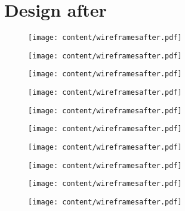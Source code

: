 \section{Design after}
\label{appendix:b}
\begin{figure}[H]
\texttt{[image: content/wireframesafter.pdf]}
\end{figure}
\begin{figure}[H]
\texttt{[image: content/wireframesafter.pdf]}
\end{figure}
\begin{figure}[H]
\texttt{[image: content/wireframesafter.pdf]}
\end{figure}
\begin{figure}[H]
\texttt{[image: content/wireframesafter.pdf]}
\end{figure}
\begin{figure}[H]
\texttt{[image: content/wireframesafter.pdf]}
\end{figure}
\begin{figure}[H]
\texttt{[image: content/wireframesafter.pdf]}
\end{figure}
\begin{figure}[H]
\texttt{[image: content/wireframesafter.pdf]}
\end{figure}
\begin{figure}[H]
\texttt{[image: content/wireframesafter.pdf]}
\end{figure}
\begin{figure}[H]
\texttt{[image: content/wireframesafter.pdf]}
\end{figure}
\begin{figure}[H]
\texttt{[image: content/wireframesafter.pdf]}
\end{figure}